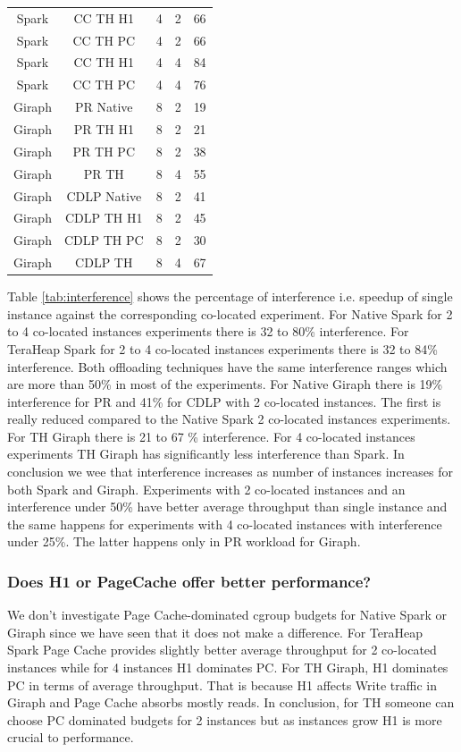 \begin{table}[thbp]
\begin{tabular}{|c|c|c|c|c|}
          Spark & CC TH H1 & 4 & 2 & 66 \\
          Spark & CC TH PC & 4 & 2 & 66 \\
          Spark & CC TH H1 & 4 & 4 & 84  \\
          Spark & CC TH PC & 4 & 4 & 76 \\
          Giraph & PR Native & 8 & 2 & 19 \\
          Giraph & PR TH H1 & 8 & 2 & 21 \\
          Giraph & PR TH PC & 8 & 2 & 38 \\
          Giraph & PR TH & 8 & 4 & 55 \\
          Giraph & CDLP Native & 8 & 2 & 41 \\
          Giraph & CDLP TH H1 & 8 & 2 & 45 \\
          Giraph & CDLP TH PC & 8 & 2 & 30 \\
          Giraph & CDLP TH & 8 & 4 & 67 \\
    \hline
  \end{tabular}
\end{table}


Table \ref{tab:interference} shows the percentage of interference i.e. speedup of single instance against the corresponding co-located experiment. For Native Spark for 2 to 4 co-located instances experiments there is 32 to 80\% interference. For TeraHeap Spark for 2 to 4 co-located instances experiments there is 32 to 84\% interference. Both offloading techniques have the same interference ranges which are more than 50\% in most of the experiments. For Native Giraph there is 19\% interference for PR and 41\% for CDLP with 2 co-located instances. The first is really reduced compared to the Native Spark 2 co-located instances experiments. For TH Giraph there is 21 to 67 \% interference. For 4 co-located instances experiments TH Giraph has significantly less interference than Spark. In conclusion we wee that interference increases as number of instances increases for both Spark and Giraph. Experiments with 2 co-located instances and an interference under 50\% have better average throughput than single instance and the same happens for experiments with 4 co-located instances with interference under 25\%. The latter happens
only in PR workload for Giraph.

\subsubsection{Does H1 or PageCache offer better performance?}
We don't investigate Page Cache-dominated cgroup budgets for Native Spark or Giraph since we have seen that it does not make a difference. For TeraHeap Spark Page Cache provides slightly better average throughput for 2 co-located instances while for 4 instances H1 dominates PC. For TH Giraph, H1 dominates PC in terms of average throughput. That is because H1 affects Write traffic in Giraph and Page Cache absorbs mostly reads. In conclusion, for TH someone can choose PC dominated budgets for 2 instances but as instances grow H1 is more crucial to performance.

